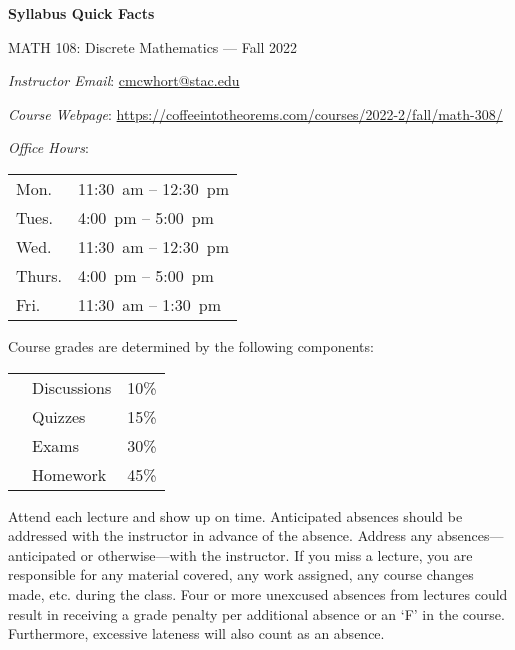 \documentclass[11pt,letterpaper]{article}
\begin{document}
\begin{center} 
\bfseries
\color{stacred}
\LARGE Syllabus Quick Facts \par\vspace{0.2\baselineskip}
\Large MATH 108: Discrete Mathematics --- Fall 2022 
\end{center} \pspace


\hspace{0.53cm} {\itshape Instructor Email}: \href{mailto:cmcwhort@stac.edu}{cmcwhort@stac.edu} \par
\hspace{0.53cm} {\itshape Course Webpage}: \href{https://coffeeintotheorems.com/courses/2022-2/fall/math-308/}{https://coffeeintotheorems.com/courses/2022-2/fall/math-308/} \par
\hspace{0.53cm} {\itshape Office Hours}: 	\par \vspace{-0.3cm}
	\begin{table}[!ht]
	\centering
	\begin{tabular}{l || l}
	Mon. & 11:30~am -- 12:30~pm \\
	Tues. & 4:00~pm -- 5:00~pm \\
	Wed. & 11:30~am -- 12:30~pm \\
	Thurs. & 4:00~pm -- 5:00~pm \\
	Fri. & 11:30~am -- 1:30~pm
	\end{tabular}
	\end{table}


Course grades are determined by the following components: \par \vspace{-0.3cm}
	\begin{table}[!ht]
        \begin{tabular}{clr}
        & Discussions & 10\% \\
	& Quizzes & 15\% \\
	& Exams & 30\% \\
	& Homework & 45\% \\
        \end{tabular} 
        \end{table}


Attend each lecture and show up on time. Anticipated absences should be addressed with the instructor in advance of the absence. Address any absences---anticipated or otherwise---with the instructor. If you miss a lecture, you are responsible for any material covered, any work assigned, any course changes made, etc. during the class. Four or more unexcused absences from lectures could result in receiving a grade penalty per additional absence or an `F' in the course. Furthermore, excessive lateness will also count as an absence. \pspace
\end{document}
